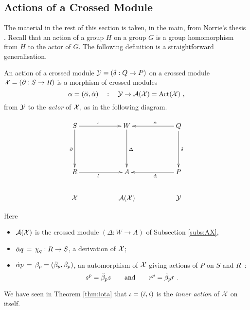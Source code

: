 

\subsection{Actions of a Crossed Module}
\label{subs:xmod-action}

The material in the rest of this section is taken, in the main, 
from Norrie's thesis \cite{nor2}.
Recall that an action of a group $H$ on a group $G$
is a group homomorphism from $H$ to the actor of $G$.
The following definition is a straightforward generalisation.

\begin{defn} 
An action of a crossed module  $\mathcal{Y} = (\delta : Q \to P)$
on a crossed module  $\mathcal{X} = (\partial : S \to R)$ 
is a morphism of crossed modules
$$
\alpha = (\ddot{\alpha},\dot{\alpha}) \quad : \quad \mathcal{Y} \to \mathcal{A}(\mathcal{X}) = \mathrm{Act}(\mathcal{X})~,
$$
from $\mathcal{Y}$ to the \emph{actor} of $\mathcal{X}$, as in the following diagram.

\begin{equation} \label{eq:sq2}
\vcenter{\xymatrix{ 
  S \ar[rr]^(0.45){\ddi} \ar[dd]_{\partial}
     && W \ar[dd]^{\Delta}
     && Q \ar[ll]_(0.45){\dda} \ar[dd]^{\delta}  \\
     &&  &&  \\
  R \ar[rr]_(0.45){\di}
     && A
     && P \ar[ll]^(0.45){\da}  \\
  \calX
     && \calA(\calX)
         && \calY  \\
}}
\end{equation}
\end{defn}

\noindent
Here 
\begin{itemize}
\item
$\mathcal{A}(\mathcal{X})$  is the crossed module  $(\Delta : W \to A)$ 
of Subsection \ref{subs:AX},
\item
$\ddot{\alpha} q \,=\, \chi_q : R \to S$, a derivation of $\mathcal{X}$;
\item
$\dot{\alpha} p \,=\, \beta_p = (\ddot{\beta}_p,\dot{\beta}_p)$,
an automorphism of  $\mathcal{X}$  giving actions of  $P$  on  $S$  and  $R$~:
$$
s^p = \ddot{\beta}_p s
\quad \quad \mbox{and} \quad \quad  
r^p = \dot{\beta}_p r ~.
$$
\end{itemize}

\noindent
We have seen in Theorem \ref{thm:iota} that $\iota = (\ddot{\iota},\dot{\iota})$ 
is the \emph{inner action} of $\mathcal{X}$ on itself.

